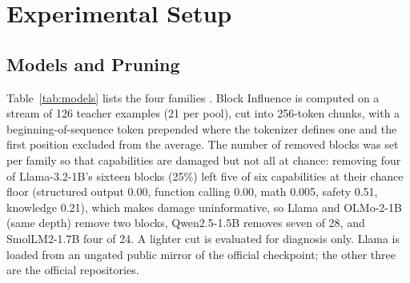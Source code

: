 \documentclass{ieeeaccess}
\begin{document}
\section{Experimental Setup}
\label{sec:setup}

\subsection{Models and Pruning}
Table~\ref{tab:models} lists the four families \cite{grattafiori2024llama3,qwen2025qwen25,allal2025smollm2,olmo2025olmo2}. Block Influence is computed on a stream of 126 teacher examples (21 per pool), cut into 256-token chunks, with a beginning-of-sequence token prepended where the tokenizer defines one and the first position excluded from the average. The number of removed blocks was set per family so that capabilities are damaged but not all at chance: removing four of Llama-3.2-1B's sixteen blocks (25\%) left five of six capabilities at their chance floor (structured output 0.00, function calling 0.00, math 0.005, safety 0.51, knowledge 0.21), which makes damage uninformative, so Llama and OLMo-2-1B (same depth) remove two blocks, Qwen2.5-1.5B removes seven of 28, and SmolLM2-1.7B four of 24. A lighter cut is evaluated for diagnosis only. Llama is loaded from an ungated public mirror of the official checkpoint; the other three are the official repositories.

\begin{table}[t]
\caption{Model families, Block-Influence cuts (original block indices; block~0 is never removed), and the hardware each family ran on.}
\label{tab:models}
\centering\footnotesize
\resizebox{\textwidth}{!}{}
\end{table}
\end{document}
